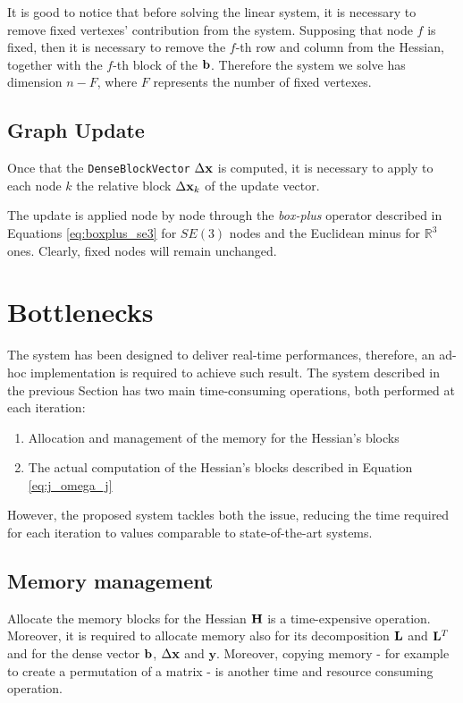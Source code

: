 It is good to notice that before solving the linear system, it is necessary to remove fixed vertexes' contribution from the system. Supposing that node $f$ is fixed, then it is necessary to remove the $f$-th row and column from the Hessian, together with the $f$-th block of the $\mathbf{b}$. Therefore the system we solve has dimension $n - F$, where $F$ represents the number of fixed vertexes.

\subsection{Graph Update}\label{subsec:update}
Once that the \texttt{DenseBlockVector} $\Delta \mathbf{x}$ is computed, it is necessary to apply to each node $k$ the relative block $\Delta \mathbf{x}_k$ of the update vector.

The update is applied node by node through the \textit{box-plus} operator described in Equations \ref{eq:boxplus_se3} for $SE(3)$ nodes and the Euclidean minus for $\mathbb{R}^3$ ones. Clearly, fixed nodes will remain unchanged. 

\section{Bottlenecks}\label{sec:bottlenecks}
The system has been designed to deliver real-time performances, therefore, an ad-hoc implementation is required to achieve such result. The system described in the previous Section has two main time-consuming operations, both performed at each iteration:

\begin{enumerate}
    \item Allocation and management of the memory for the Hessian's blocks
    \item The actual computation of the Hessian's blocks described in Equation \ref{eq:j_omega_j}
\end{enumerate}

However, the proposed system tackles both the issue, reducing the time required for each iteration to values comparable to state-of-the-art systems.

\subsection{Memory management}\label{subsec:memory_management}
Allocate the memory blocks for the Hessian $\mathbf{H}$ is a time-expensive operation. Moreover, it is required to allocate memory also for its decomposition $\mathbf{L}$ and $\mathbf{L}^T$ and for the dense vector $\mathbf{b}$, $\Delta \mathbf{x}$ and $\mathbf{y}$. Moreover, copying memory - for example to create a permutation of a matrix -  is another time and resource consuming operation. 

